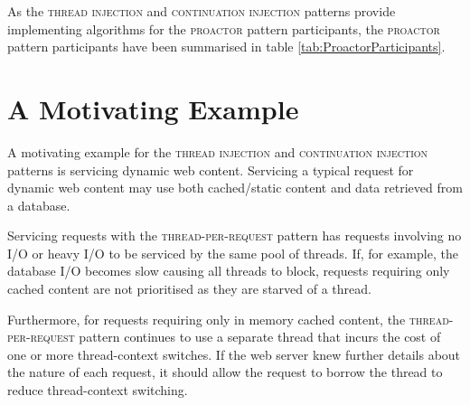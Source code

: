 \documentclass[prodmode]{style/acmlarge}
\begin{document}
As the \textsc{thread injection} and \textsc{continuation injection} patterns provide implementing
algorithms for the \textsc{proactor} pattern participants, the \textsc{proactor}
pattern participants have been summarised in table
\ref{tab:ProactorParticipants}.

\begin{table}[t]
\label{tab:ProactorParticipants}
\end{table}



\section{A Motivating Example}

A motivating example for the \textsc{thread injection} and \textsc{continuation
injection} patterns is servicing dynamic web content.  Servicing a typical
request for dynamic web content may use both cached/static content and data
retrieved from a database.

Servicing requests with the \textsc{thread-per-request} pattern has requests
involving no I/O or heavy I/O to be serviced by the same pool of threads.  If,
for example, the database I/O becomes slow causing all threads to block,
requests requiring only cached content are not prioritised as they are starved
of a thread.

Furthermore, for requests requiring only in memory cached content, the
\textsc{thread-per-request} pattern continues to use a separate thread that
incurs the cost of one or more thread-context switches.  If the web server knew
further details about the nature of each request, it should allow the request to
borrow the thread to reduce thread-context switching.
\end{document}
